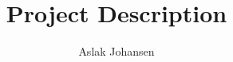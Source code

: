 \usepackage[english]{babel} %
\usepackage{graphics} %
\usepackage{hyperref} %

\usepackage{footnote}

\makeatletter\AtBeginDocument{\let\@elt\relax}\makeatother

\setlength{\parindent}{0em} %
\setlength{\parskip}{1em} %

\newcommand{\textdesc}[1]{\textit{\textbf{#1}}}
\newcommand{\descitem}[1]{\item \textdesc{#1}}

\title{Project Description}
\author{Aslak Johansen}



\maketitle

\setcounter{tocdepth}{2}
\tableofcontents

